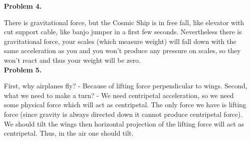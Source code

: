 \documentclass[12pt]{article}
\begin{document}
{\bf Problem 4.}

There is gravitational force, but the Cosmic Ship is in free fall, like elevator with cut
support cable, like banjo jumper in a first few seconds. Nevertheless there is gravitational
force, your scales  (which measure weight) will fall down with the same acceleration
as you and you won't produce any pressure on scales, so they won't react and 
thus your weight will be zero.
\\

{\bf Problem 5.}
 
 First, why airplanes fly? - Because of lifting force perpendicular to wings.
 Second, what we need to make a turn? - We need centripetal acceleration, so
 we need some physical force which will act as centripetal. The only force we have
 is lifting force (since gravity is always directed down it cannot produce centripetal force).
 We should tilt the wings then horizontal projection of the lifting force will act as
 centripetal. Thus, in the air one should tilt.
\end{document}
